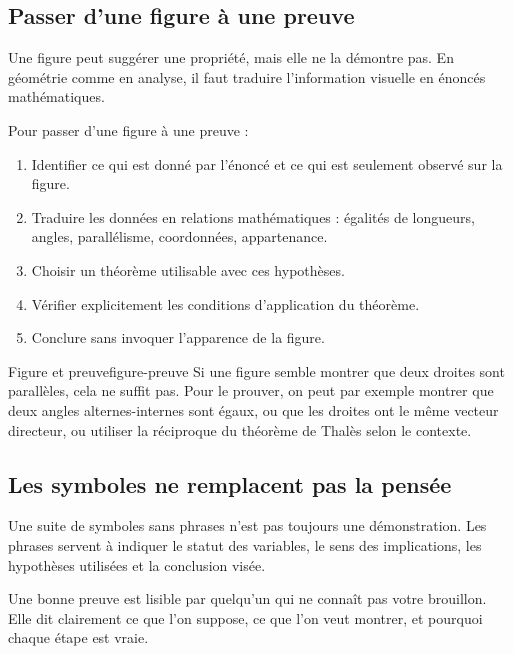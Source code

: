 \documentclass[11pt,a4paper]{article}
\begin{document}
\subsection{Passer d'une figure à une preuve}

Une figure peut suggérer une propriété, mais elle ne la démontre pas. En géométrie comme en analyse, il faut traduire l'information visuelle en énoncés mathématiques.

\begin{methodebox}
Pour passer d'une figure à une preuve :
\begin{enumerate}
  \item Identifier ce qui est donné par l'énoncé et ce qui est seulement observé sur la figure.
  \item Traduire les données en relations mathématiques : égalités de longueurs, angles, parallélisme, coordonnées, appartenance.
  \item Choisir un théorème utilisable avec ces hypothèses.
  \item Vérifier explicitement les conditions d'application du théorème.
  \item Conclure sans invoquer l'apparence de la figure.
\end{enumerate}
\end{methodebox}

\begin{exemplebox}{Figure et preuve}{figure-preuve}
Si une figure semble montrer que deux droites sont parallèles, cela ne suffit pas. Pour le prouver, on peut par exemple montrer que deux angles alternes-internes sont égaux, ou que les droites ont le même vecteur directeur, ou utiliser la réciproque du théorème de Thalès selon le contexte.
\end{exemplebox}

\subsection{Les symboles ne remplacent pas la pensée}

\begin{erreurbox}
Une suite de symboles sans phrases n'est pas toujours une démonstration. Les phrases servent à indiquer le statut des variables, le sens des implications, les hypothèses utilisées et la conclusion visée.
\end{erreurbox}

\begin{retenirbox}
Une bonne preuve est lisible par quelqu'un qui ne connaît pas votre brouillon. Elle dit clairement ce que l'on suppose, ce que l'on veut montrer, et pourquoi chaque étape est vraie.
\end{retenirbox}
\end{document}
